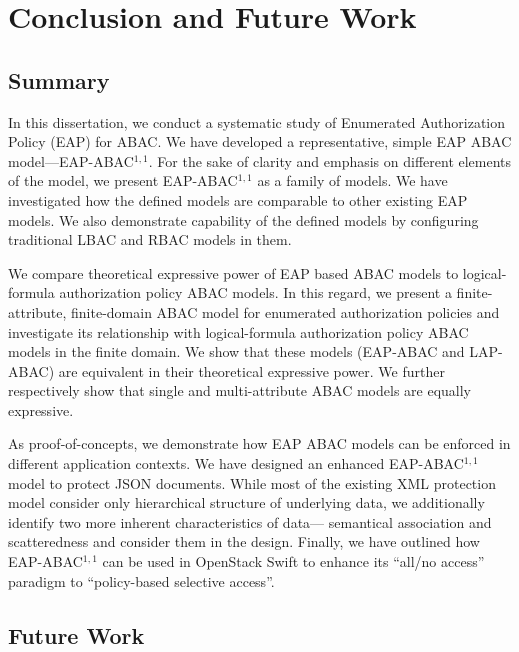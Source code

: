 \chapter{Conclusion and Future Work}
\label{sec:conclusion}
\section{Summary}
In this dissertation, we conduct a systematic study of Enumerated Authorization Policy (EAP) for ABAC. We have developed a representative, simple EAP ABAC model---EAP-ABAC$^{1,1}$. For the sake of clarity and emphasis on different elements of the model, we present EAP-ABAC$^{1,1}$ as a family of models. We have investigated how the defined models are comparable to other existing EAP models. We also demonstrate capability of the defined models by configuring traditional LBAC and RBAC models in them. 

We compare theoretical expressive power of EAP based ABAC models to logical-formula authorization policy ABAC models. In this regard, we present a finite-attribute, finite-domain ABAC model for enumerated authorization policies and investigate its relationship with logical-formula authorization policy ABAC models in the finite domain. We show that these models (EAP-ABAC and LAP-ABAC) are equivalent in their theoretical expressive power. We further respectively show that single and multi-attribute ABAC models are equally expressive.

As proof-of-concepts, we demonstrate how EAP ABAC models can be enforced in different application contexts. We have designed an enhanced EAP-ABAC$^{1,1}$ model to protect JSON documents. While most of the existing XML protection model consider only hierarchical structure of underlying data, we additionally identify two more inherent characteristics of data--- semantical association and scatteredness and consider them in the design. Finally, we have outlined how EAP-ABAC$^{1,1}$ can be used in OpenStack Swift to enhance its ``all/no access'' paradigm to ``policy-based selective access''.

\section{Future Work}

